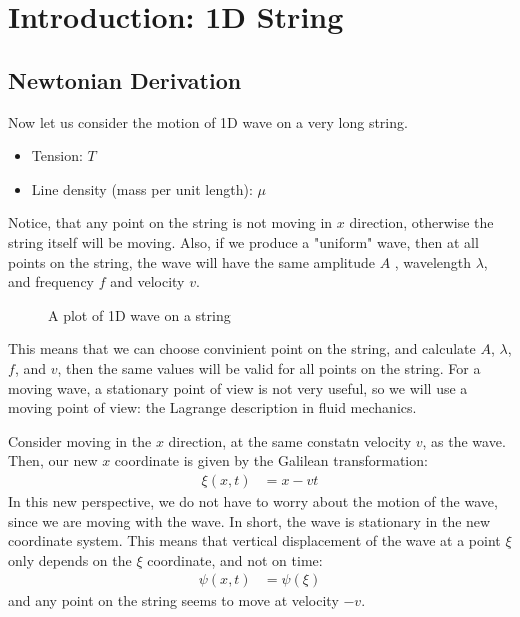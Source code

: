 \section{Introduction: 1D String}
\subsection{Newtonian Derivation}
Now let us consider the motion of 1D wave on a very long string.
\begin{itemize}
  \item Tension: $T$
  \item Line density (mass per unit length): $\mu$
\end{itemize}
Notice, that any point on the string is not moving in $x$ direction, otherwise the string itself will be moving.
Also, if we produce a "uniform" wave, then at all points on the string, the wave will have the same amplitude $A$ , wavelength $\lambda$, and frequency $f$  and velocity $v$.
\begin{figure}[htbp]
  \centering
  \caption{A plot of 1D wave on a string}
  \label{fig:string}
\end{figure}
This means that we can choose convinient point on the string, and calculate $A$, $\lambda$, $f$, and $v$, then the same values will be valid for all points on the string.
For a moving wave, a stationary point of view is not very useful, so we will use a moving point of view: the Lagrange description in fluid mechanics.

Consider moving in the $x$ direction, at the same constatn velocity $v$, as the wave.
Then, our new $x$ coordinate is given by the Galilean transformation:
\begin{align}
  \xi(x, t) & = x - vt
\end{align}
In this new perspective, we do not have to worry about the motion of the wave, since we are moving with the wave.
In short, the wave is stationary in the new coordinate system.
This means that vertical displacement of the wave at a point $\xi$ only depends on the $\xi$ coordinate, and not on time:
\begin{align}
  \psi(x, t) & = \psi(\xi)
\end{align}
and any point on the string seems to move at velocity $-v$.

